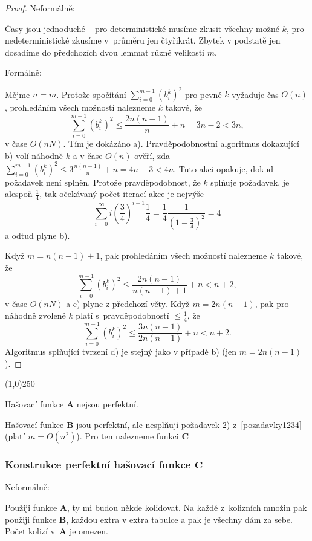 \documentclass[a4paper,12pt]{article}
\newenvironment{myproof}{
  \begin{proof}
    
  }{
  \end{proof}
  \begin{center}
   \line(1,0){250}
   \end{center}
  }
\begin{document}
\begin{myproof}
    
    Neformálně:
    
    Časy jsou jednoduché -- pro deterministické musíme zkusit všechny možné $k$, pro nedeterministické zkusíme v~průměru jen čtyřikrát. Zbytek v podstatě jen dosadíme do předchozích dvou lemmat různé velikosti $m$.
    
    Formálně:
    
    Mějme $n=m$. Protože spočítání 
$\sum_{i=0}^{m-1}(b_i^k)^2$ pro pevné $k$ vyžaduje čas $O
(n)$, prohledáním 
všech možností nalez\-ne\-me $k$ takové, že 
$$\sum_{i=0}^{m-1}(b_i^k)^2\le\frac {2n(n-1)}n+n=3n-2<3n,$$
v čase $O(nN)$. Tím je 
dokázáno a). Pravděpodobnostní algoritmus dokazující b) volí 
náhodně $k$ a v čase $O(n)$ ověří, zda 
$\sum_{i=0}^{m-1}(b_i^k)^2\le 3\frac {n(n-1)}n+n=4n-3<4n$. Tuto akci opakuje, dokud 
požadavek není splněn. Protože pravděpodobnost, že $
k$ splňuje 
požadavek, je alespoň $\frac 14$, tak očekávaný počet ite\-rací 
akce je nejvýše 
$$\sum_{i=0}^{\infty}i(\frac 34)^{i-1}\frac 14=\frac 14\frac 1{(1
-\frac 34)^2}=4$$
a odtud plyne b). 

Když $m=n(n-1)+1$, pak prohledáním všech možností 
nalezne\-me $k$ takové, že 
$$\sum_{i=0}^{m-1}(b_i^k)^2\le\frac {2n(n-1)}{n(n-1)+1}+n<n+2,$$
 v 
čase $O(nN)$ a c) plyne z předchozí věty. Když 
$m=2n(n-1)$, pak pro náhodně zvolené $k$ platí s~pravděpodobností $\le\frac 14$, že 
$$\sum_{i=0}^{m-1}(b_i^k)^2\le\frac {3n(n-1)}{2n(n-1)}+n<n+2.$$
Algoritmus splňující tvrzení d) je stejný jako 
v případě b) (jen $m=2n(n-1)$).

\end{myproof}


Hašovací funkce $\mathbf{A}$ nejsou perfektní.

Hašovací funkce $\mathbf{B}$ jsou perfektní, ale 
nesplňují poža\-davek 2) z~\ref{pozadavky1234} (platí $m=\Theta (n^2)$).  Pro ten nalezneme funkci $\mathbf{C}$

\subsubsection{Konstrukce perfektní hašovací funkce $\mathbf{C}$}

Neformálně:

Použiji funkce $\mathbf{A}$, ty mi budou někde kolidovat. Na každé z~kolizních množin pak použiji funkce $\mathbf{B}$, každou extra v extra tabulce a pak je všechny dám za sebe. Počet kolizí v~$\mathbf{A}$ je omezen.
\end{document}
